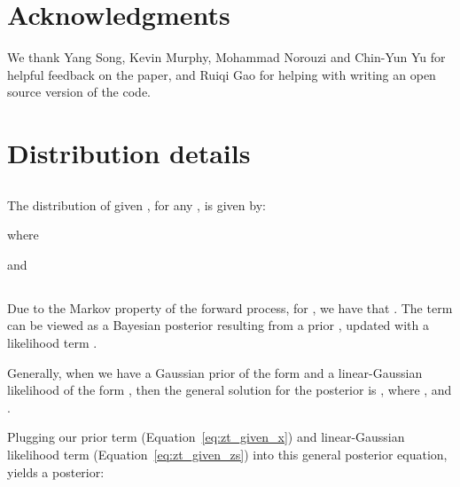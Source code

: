 \documentclass{article}
\def\Eqref#1{Equation~\ref{#1}}
\begin{document}
\section*{Acknowledgments}
We thank Yang Song, Kevin Murphy, Mohammad Norouzi and Chin-Yun Yu for helpful feedback on the paper, and Ruiqi Gao for helping with writing an open source version of the code.












 


















\vfill
\pagebreak
\appendix

\section{Distribution details}
\label{sec:distributions}

\subsection{}
The distribution of  given , for any , is given by:

where

and




\subsection{}
Due to the Markov property of the forward process, for , we have that .
The term  can be viewed as a Bayesian posterior resulting from a prior , updated with a likelihood term .

Generally, when we have a Gaussian prior of the form  and a linear-Gaussian likelihood of the form , then the general solution for the posterior is , where , and .

Plugging our prior term  (\Eqref{eq:zt_given_x}) and linear-Gaussian likelihood term  (\Eqref{eq:zt_given_zs}) into this general posterior equation, yields a posterior:
\end{document}
